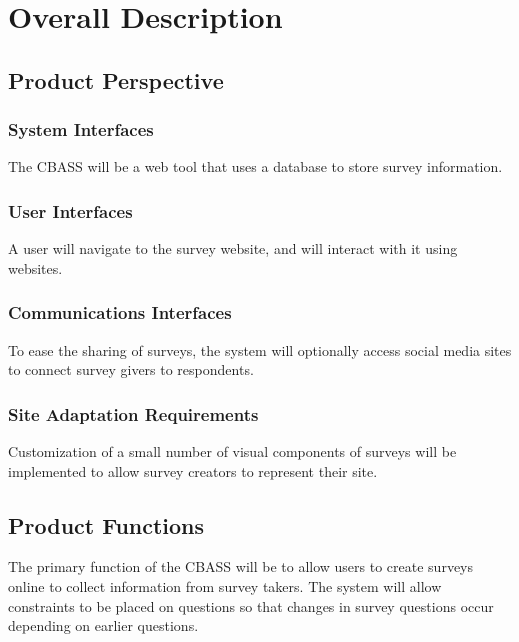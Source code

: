 \documentclass[10pt,letter]{report}
\begin{document}
\chapter{Overall Description}
\label{cha:overall-description}

\section{Product Perspective}
\label{sec:product-perspective}

\subsection{System Interfaces}
\label{sec:system-interfaces}

The CBASS will be a web tool that uses a database to store
survey information.

\subsection{User Interfaces}
\label{sec:user-interfaces}

A user will navigate to the survey website, and will interact with
it using websites.

\subsection{Communications Interfaces}
\label{sec:communications-interfaces}

To ease the sharing of surveys, the system will optionally access
social media sites to connect survey givers to respondents.

\subsection{Site Adaptation Requirements}
\label{sec:site-adaptation-requrements}

Customization of a small number of visual components of surveys will
be implemented to allow survey creators to represent their site.

\section{Product Functions}
\label{sec:product-functions}

The primary function of the CBASS will be to allow users to create surveys online
to collect information from survey takers. The system will allow constraints to
be placed on questions so that changes in survey questions occur depending on
earlier questions.
\end{document}
